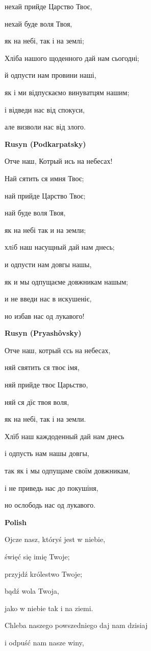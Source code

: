 нехай прийде Царство Твоє,

нехай буде воля Твоя,

як на небі, так і на землі;

Хліба нашого щоденного дай нам сьогодні;

й одпусти нам провини наші,

як і ми відпускаємо винуватцям нашим;

і відведи нас від спокуси,

але визволи нас від злого.

\textbf{Rusyn (Podkarpatsky)}

Отче наш, Котрый ись на небесах!

Най сятить ся имня Твоє;

най прийде Царство Твоє;

най буде воля Твоя,

як на небі так и на земли;

хлiб наш насущный дай нам днесь;

и одпусти нам довгы нашы,

як и мы одпущаєме довжникам нашым;

и не введи нас в искушеніє,

но избав нас од лукавого!

\textbf{Rusyn (Pryashôvsky)}

Отче наш, котрый єсь на небесах,

няй святить ся твоє імя,

няй прийде твоє Царьство,

няй ся дїє твоя воля,

як на небі, так і на земли.

Хлїб наш каждоденный дай нам днесь

і одпусть нам нашы довгы,

так як і мы одпущаме своїм довжникам,

і не приведь нас до покушіня,

но ослободь нас од лукавого.

\textbf{Polish}

Ojcze nasz, któryś jest w niebie,

święć się imię Twoje;

przyjdź królestwo Twoje;

bądź wola Twoja,

jako w niebie tak i na ziemi.

Chleba naszego powszedniego daj nam dzisiaj

i odpuść nam nasze winy,

